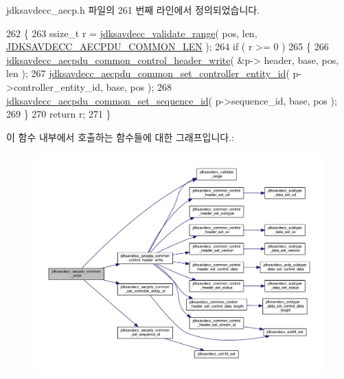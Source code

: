 jdksavdecc\+\_\+aecp.\+h 파일의 261 번째 라인에서 정의되었습니다.


\begin{DoxyCode}
262 \{
263     ssize\_t r = \hyperlink{group__util_ga9c02bdfe76c69163647c3196db7a73a1}{jdksavdecc\_validate\_range}( pos, len, 
      \hyperlink{group__aecpdu_ga1311febb873dfac7b4035ed25460f9d1}{JDKSAVDECC\_AECPDU\_COMMON\_LEN} );
264     \textcolor{keywordflow}{if} ( r >= 0 )
265     \{
266         \hyperlink{group__aecpdu_ga828eb506e6ecb72b56d72cd4e4fd433a}{jdksavdecc\_aecpdu\_common\_control\_header\_write}( &p->
      header, base, pos, len );
267         \hyperlink{group__aecpdu__common_ga5eb29ca4c6d9dc424e108e99132d4ec7}{jdksavdecc\_aecpdu\_common\_set\_controller\_entity\_id}(
       p->controller\_entity\_id, base, pos );
268         \hyperlink{group__aecpdu__common_gab9f7895d1c5befd0b2965510dfe66533}{jdksavdecc\_aecpdu\_common\_set\_sequence\_id}( p->sequence\_id, 
      base, pos );
269     \}
270     \textcolor{keywordflow}{return} r;
271 \}
\end{DoxyCode}


이 함수 내부에서 호출하는 함수들에 대한 그래프입니다.\+:
\nopagebreak
\begin{figure}[H]
\begin{center}
\leavevmode
\includegraphics[width=350pt]{group__aecpdu__common_gac85377ae2518276697173afa5db77526_cgraph}
\end{center}
\end{figure}





